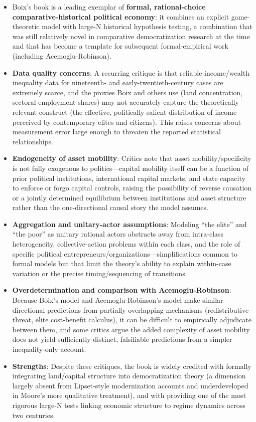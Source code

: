 \documentclass[12pt]{article}
\begin{document}
\begin{itemize}[leftmargin=*, itemsep=4pt]
    \item Boix's book is a leading exemplar of \textbf{formal, rational-choice comparative-historical political economy}: it combines an explicit game-theoretic model with large-N historical hypothesis testing, a combination that was still relatively novel in comparative democratization research at the time and that has become a template for subsequent formal-empirical work (including Acemoglu-Robinson).
    \item \textbf{Data quality concerns}: A recurring critique is that reliable income/wealth inequality data for nineteenth- and early-twentieth-century cases are extremely scarce, and the proxies Boix and others use (land concentration, sectoral employment shares) may not accurately capture the theoretically relevant construct (the effective, politically-salient distribution of income perceived by contemporary elites and citizens). This raises concerns about measurement error large enough to threaten the reported statistical relationships.
    \item \textbf{Endogeneity of asset mobility}: Critics note that asset mobility/specificity is not fully exogenous to politics---capital mobility itself can be a function of prior political institutions, international capital markets, and state capacity to enforce or forgo capital controls, raising the possibility of reverse causation or a jointly determined equilibrium between institutions and asset structure rather than the one-directional causal story the model assumes.
    \item \textbf{Aggregation and unitary-actor assumptions}: Modeling ``the elite'' and ``the poor'' as unitary rational actors abstracts away from intra-class heterogeneity, collective-action problems within each class, and the role of specific political entrepreneurs/organizations---simplifications common to formal models but that limit the theory's ability to explain within-case variation or the precise timing/sequencing of transitions.
    \item \textbf{Overdetermination and comparison with Acemoglu-Robinson}: Because Boix's model and Acemoglu-Robinson's model make similar directional predictions from partially overlapping mechanisms (redistributive threat, elite cost-benefit calculus), it can be difficult to empirically adjudicate between them, and some critics argue the added complexity of asset mobility does not yield sufficiently distinct, falsifiable predictions from a simpler inequality-only account.
    \item \textbf{Strengths}: Despite these critiques, the book is widely credited with formally integrating land/capital structure into democratization theory (a dimension largely absent from Lipset-style modernization accounts and underdeveloped in Moore's more qualitative treatment), and with providing one of the most rigorous large-N tests linking economic structure to regime dynamics across two centuries.
\end{itemize}
\end{document}
